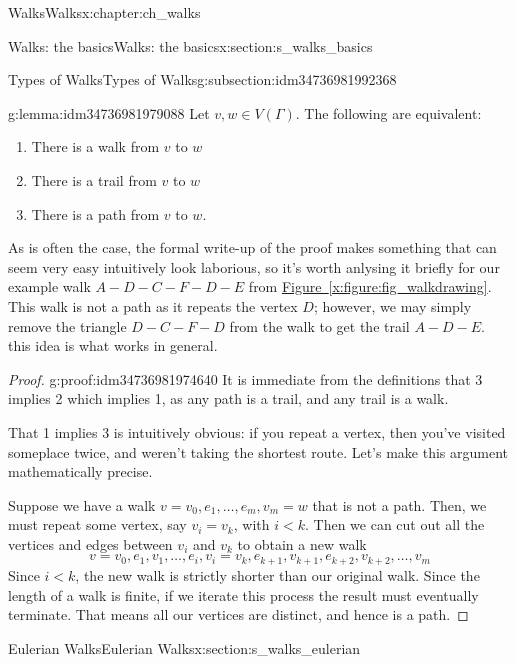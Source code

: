 \documentclass[oneside,10pt,]{book}
\newcommand{\xreffont}{\relax}
\numberwithin{equation}{section}
\newcommand{\lt}{<}
\begin{document}
\begin{chapterptx}{Walks}{}{Walks}{}{}{x:chapter:ch_walks}
\begin{sectionptx}{Walks: the basics}{}{Walks: the basics}{}{}{x:section:s_walks_basics}
\begin{subsectionptx}{Types of Walks}{}{Types of Walks}{}{}{g:subsection:idm34736981992368}
\begin{lemma}{}{}{g:lemma:idm34736981979088}%
Let \(v,w\in V(\Gamma)\).  The following are equivalent:%
%
\begin{enumerate}
\item{}There is a walk from \(v\) to \(w\)%
\item{}There is a trail from \(v\) to \(w\)%
\item{}There is a path from \(v\) to \(w\).%
\end{enumerate}
\end{lemma}
As is often the case, the formal write-up of the proof makes something that can seem very easy intuitively look laborious, so it's worth anlysing it briefly for our example walk \(A-D-C-F-D-E\) from \hyperref[x:figure:fig_walkdrawing]{Figure~{\xreffont\ref{x:figure:fig_walkdrawing}}}.  This walk is not a path as it repeats the vertex \(D\); however, we may simply remove the triangle \(D-C-F-D\) from the walk to get the trail \(A-D-E\).  this idea is what works in general.%
\begin{proof}{}{g:proof:idm34736981974640}
It is immediate from the definitions that 3 implies 2 which implies 1, as any path is a trail, and any trail is a walk.%
\par
That 1 implies 3 is intuitively obvious: if you repeat a vertex, then you've visited someplace twice, and weren't taking the shortest route.  Let's make this argument mathematically precise.%
\par
Suppose we have a walk \(v=v_0,e_1,\dots, e_m, v_m=w\) that is not a path.  Then, we must repeat some vertex, say \(v_i=v_k\), with \(i\lt k\).  Then we can cut out all the vertices and edges between \(v_i\) and \(v_k\) to obtain a new walk%
%
\begin{equation*}
v=v_0,e_1, v_1,\dots, e_i, v_i=v_k, e_{k+1}, v_{k+1}, e_{k+2}, v_{k+2}, \dots, v_m
\end{equation*}
Since \(i \lt k \), the new walk is strictly shorter than our original walk.  Since the length of a walk is finite, if we iterate this process the result must eventually terminate.  That means all our vertices are distinct, and hence is a path.%
\end{proof}
\end{subsectionptx}
\end{sectionptx}
%
%
\typeout{************************************************}
\typeout{************************************************}
%
\begin{sectionptx}{Eulerian Walks}{}{Eulerian Walks}{}{}{x:section:s_walks_eulerian}

\end{sectionptx}
\end{chapterptx}
\end{document}
